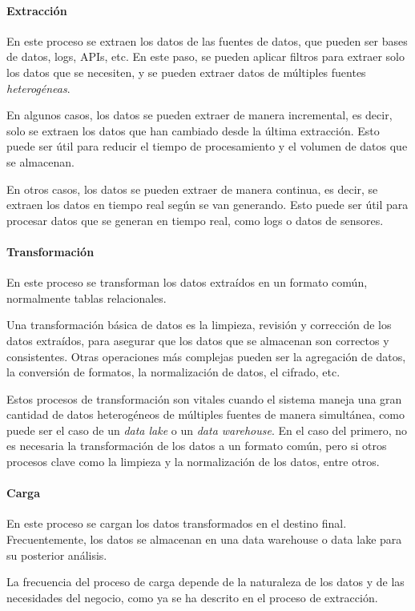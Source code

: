\paragraph{Extracción}
En este proceso se extraen los datos de las fuentes de datos, que pueden ser bases de datos, logs,
APIs, etc. En este paso, se pueden aplicar filtros para extraer solo los datos que se necesiten, y
se pueden extraer datos de múltiples fuentes \emph{heterogéneas}.

En algunos casos, los datos se pueden extraer de manera incremental, es decir, solo se extraen los
datos que han cambiado desde la última extracción. Esto puede ser útil para reducir el tiempo de
procesamiento y el volumen de datos que se almacenan.

En otros casos, los datos se pueden extraer de manera continua, es decir, se extraen los datos en
tiempo real según se van generando. Esto puede ser útil para procesar datos que se generan en tiempo
real, como logs o datos de sensores.

\paragraph{Transformación}
En este proceso se transforman los datos extraídos en un formato común, normalmente tablas relacionales.

Una transformación básica de datos es la limpieza, revisión y corrección de los datos extraídos,
para asegurar que los datos que se almacenan son correctos y consistentes. Otras operaciones más
complejas pueden ser la agregación de datos, la conversión de formatos, la normalización de datos,
el cifrado, etc.

Estos procesos de transformación son vitales cuando el sistema maneja una gran cantidad de datos heterogéneos
de múltiples fuentes de manera simultánea, como puede ser el caso de un \textit{data lake} o un \textit{data
warehouse}. En el caso del primero, no es necesaria la transformación de los datos a un formato común, pero si
otros procesos clave como la limpieza y la normalización de los datos, entre otros.

\paragraph{Carga}
En este proceso se cargan los datos transformados en el destino final. Frecuentemente, los datos se
almacenan en una data warehouse o data lake para su posterior análisis.

La frecuencia del proceso de carga depende de la naturaleza de los datos y de las necesidades del
negocio, como ya se ha descrito en el proceso de extracción.

